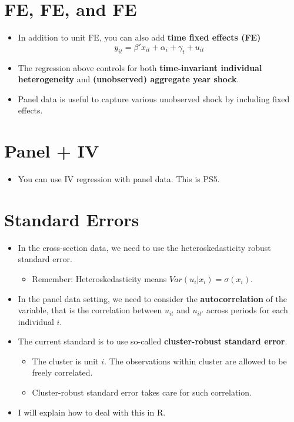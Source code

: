 \documentclass[]{book}
\providecommand{\tightlist}{%
  \setlength{\itemsep}{0pt}\setlength{\parskip}{0pt}}
\begin{document}
\section{FE, FE, and FE}\label{fe-fe-and-fe}

\begin{itemize}
\tightlist
\item
  In addition to unit FE, you can also add \textbf{time fixed effects
  (FE)} \[
  y_{it} = \beta' x_{it} + \alpha_i + \gamma_t + u_{it}
  \]
\item
  The regression above controls for both \textbf{time-invariant
  individual heterogeneity} and \textbf{(unobserved) aggregate year
  shock}.
\item
  Panel data is useful to capture various unobserved shock by including
  fixed effects.
\end{itemize}

\section{Panel + IV}\label{panel-iv}

\begin{itemize}
\tightlist
\item
  You can use IV regression with panel data. This is PS5.
\end{itemize}

\section{Standard Errors}\label{standard-errors}

\begin{itemize}
\tightlist
\item
  In the cross-section data, we need to use the heteroskedasticity
  robust standard error.

  \begin{itemize}
  \tightlist
  \item
    Remember: Heteroskedasticity means \(Var(u_i | x_i) = \sigma(x_i)\).
  \end{itemize}
\item
  In the panel data setting, we need to consider the
  \textbf{autocorrelation} of the variable, that is the correlation
  between \(u_{it}\) and \(u_{it'}\) across periods for each individual
  \(i\).
\item
  The current standard is to use so-called \textbf{cluster-robust
  standard error}.

  \begin{itemize}
  \tightlist
  \item
    The cluster is unit \(i\). The observations within cluster are
    allowed to be freely correlated.
  \item
    Cluster-robust standard error takes care for such correlation.
  \end{itemize}
\item
  I will explain how to deal with this in R.
\end{itemize}
\end{document}
